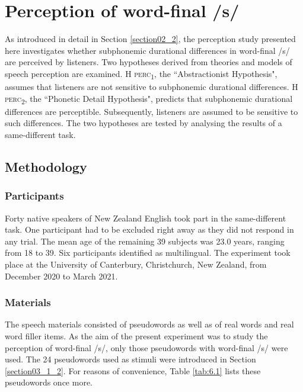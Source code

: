 \chapter{Perception of word-final /s/}\label{chapter06}

As introduced in detail in Section \ref{section02_2}, the perception study presented here investigates whether subphonemic durational differences in word-final /s/ are perceived by listeners. Two hypotheses derived from theories and models of speech perception are examined. \textsc{H perc\textsubscript{1}}, the ``Abstractionist Hypothesis", assumes that listeners are not sensitive to subphonemic durational differences. \textsc{H perc\textsubscript{2}}, the ``Phonetic Detail Hypothesis", predicts that subphonemic durational differences are perceptible. Subsequently, listeners are assumed to be sensitive to such differences. The two hypotheses are tested by analysing the results of a same-different task.

\section{Methodology}\label{section06_1}

\subsection{Participants}\label{section06_1_1}

Forty native speakers of New Zealand English took part in the same-different task. One participant had to be excluded right away as they did not respond in any trial. The mean age of the remaining 39 subjects was 23.0 years, ranging from 18 to 39. Six participants identified as multilingual. The experiment took place at the University of Canterbury, Christchurch, New Zealand, from December 2020 to March 2021. 

\subsection{Materials}\label{section06_1_2}

The speech materials consisted of pseudowords as well as of real words and real word filler items. As the aim of the present experiment was to study the perception of word-final /s/, only those pseudowords with word-final /s/ were used. The 24 pseudowords used as stimuli were introduced in Section \ref{section03_1_2}. For reasons of convenience, Table \ref{tab:6.1} lists these pseudowords once more.

